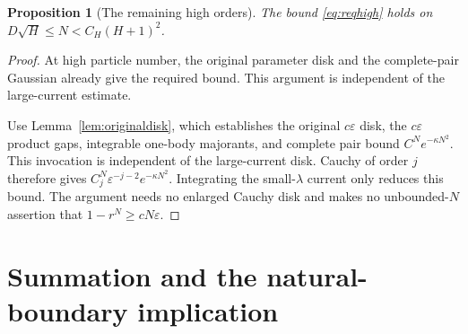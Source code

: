 \documentclass[11pt]{article}
\numberwithin{equation}{section}
\newtheorem{proposition}[theorem]{Proposition}
\theoremstyle{definition}
\newcommand{\eps}{\varepsilon}
\begin{document}
\begin{proposition}[The remaining high orders]\label{prop:highKS}
The bound \eqref{eq:reqhigh} holds on
\(D\sqrt H\le N<C_H(H+1)^2\).
\end{proposition}
\begin{proof}
At high particle number, the original parameter disk and the complete-pair Gaussian already give the required bound. This argument is independent of the large-current estimate.

Use Lemma~\ref{lem:originaldisk}, which establishes the original
\(c\eps\) disk, the \(c\eps\) product gaps, integrable one-body
majorants, and complete pair bound \(C^Ne^{-\kappa N^2}\).
This invocation is independent of the large-current disk.
Cauchy of order \(j\) therefore gives
\(C_j^N\eps^{-j-2}e^{-\kappa N^2}\).
Integrating the small-\(\lambda\) current only reduces this bound.
The argument needs no enlarged Cauchy disk and makes no
unbounded-\(N\) assertion that \(1-r^N\ge cN\eps\).
\end{proof}



\section{Summation and the natural-boundary implication}
\label{sec:conclusion}
\end{document}
